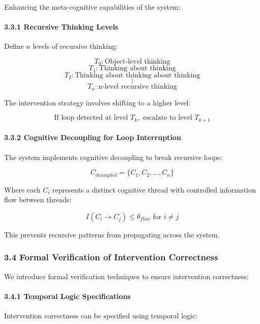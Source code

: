 \documentclass[
]{article}
\begin{document}
Enhancing the meta-cognitive capabilities of the system:

\paragraph{3.3.1 Recursive Thinking
Levels}\label{recursive-thinking-levels}

Define \(n\) levels of recursive thinking:

\[T_0: \text{Object-level thinking}\]
\[T_1: \text{Thinking about thinking}\]
\[T_2: \text{Thinking about thinking about thinking}\] \[\vdots\]
\[T_n: \text{n-level recursive thinking}\]

The intervention strategy involves shifting to a higher level:

\[\text{If loop detected at level } T_k, \text{ escalate to level } T_{k+1}\]

\paragraph{3.3.2 Cognitive Decoupling for Loop
Interruption}\label{cognitive-decoupling-for-loop-interruption}

The system implements cognitive decoupling to break recursive loops:

\[C_{decoupled} = \{C_1, C_2, ..., C_n\}\]

Where each \(C_i\) represents a distinct cognitive thread with
controlled information flow between threads:

\[I(C_i \rightarrow C_j) \leq \theta_{flow} \text{ for } i \neq j\]

This prevents recursive patterns from propagating across the system.

\subsubsection{3.4 Formal Verification of Intervention
Correctness}\label{formal-verification-of-intervention-correctness}

We introduce formal verification techniques to ensure intervention
correctness:

\paragraph{3.4.1 Temporal Logic
Specifications}\label{temporal-logic-specifications}

Intervention correctness can be specified using temporal logic:
\end{document}
